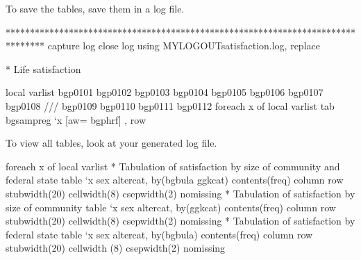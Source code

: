 \documentclass[letterpaper,10pt,openany,onesideH,english]{sphinxmanual}
\begin{document}
To save the tables, save them in a log file.

%
\begin{sphinxVerbatim}[commandchars=\\\{\},numbers=left,firstnumber=1,stepnumber=1]
********************************************************************************
capture log close
log using \PYGZdq{}\PYGZdl{}\PYGZob{}MY\PYGZus{}LOG\PYGZus{}OUT\PYGZcb{}\PYGZbs{}satisfaction.log\PYGZdq{}, replace

* Life satisfaction

local varlist bgp0101 bgp0102 bgp0103 bgp0104 bgp0105 bgp0106 bgp0107 bgp0108 /// 
bgp0109 bgp0110 bgp0111 bgp0112
foreach x of local varlist \PYGZob{}
tab bgsampreg {}`x\PYGZsq{} [aw= bgphrf] , row
\PYGZcb{}
\end{sphinxVerbatim}

\begin{figure}[H]
\centering

\noindent{}
\end{figure}

\begin{figure}[H]
\centering

\noindent{}
\end{figure}

\begin{figure}[H]
\centering

\noindent{}
\end{figure}

To view all tables, look at your generated log file.


%
\begin{sphinxVerbatim}[commandchars=\\\{\},numbers=left,firstnumber=1,stepnumber=1]
foreach x of local varlist \PYGZob{}
* Tabulation of satisfaction by size of community and federal state
table {}`x\PYGZsq{} sex alter\PYGZus{}cat, by(bgbula ggk\PYGZus{}cat) contents(freq) column row stubwidth(20) cellwidth(8) csepwidth(2) nomissing
* Tabulation of satisfaction by size of community
table {}`x\PYGZsq{} sex alter\PYGZus{}cat, by(ggk\PYGZus{}cat) contents(freq) column row stubwidth(20) cellwidth(8) csepwidth(2) nomissing
* Tabulation of satisfaction by federal state
table {}`x\PYGZsq{} sex alter\PYGZus{}cat, by(bgbula) contents(freq) column row stubwidth(20) cellwidth (8) csepwidth(2) nomissing 
\PYGZcb{}
\end{sphinxVerbatim}
\end{document}
